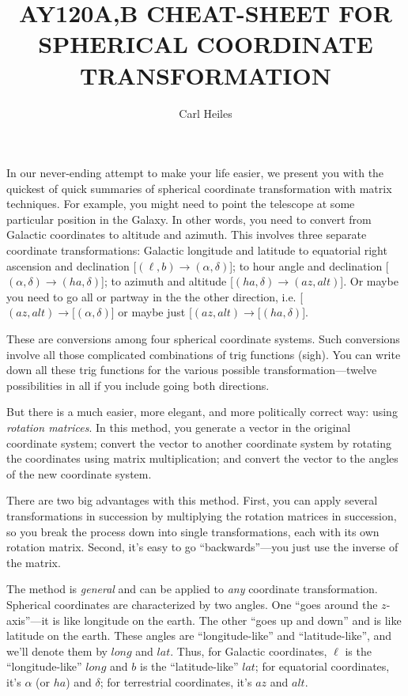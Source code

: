 

\title{AY120A,B CHEAT-SHEET FOR SPHERICAL COORDINATE TRANSFORMATION}
\author{Carl Heiles}

	In our never-ending attempt to make your life easier, we present
you with the quickest of quick summaries of spherical coordinate
transformation with matrix techniques.  For example, you might need to
point the telescope at some particular position in the Galaxy.  In other
words, you need to convert from Galactic coordinates to altitude and
azimuth.  This involves three separate coordinate transformations:
Galactic longitude and latitude to equatorial right ascension and
declination [$(\ell, b) \rightarrow (\alpha, \delta)$]; to hour angle
and declination [$(\alpha, \delta) \rightarrow (ha, \delta)$]; to
azimuth and altitude [$(ha, \delta) \rightarrow (az, alt)$].  Or maybe
you need to go all or partway in the the other direction, i.e.  [$(az,
alt) \rightarrow [(\alpha, \delta)$] or maybe just [$(az, alt)
\rightarrow [(ha, \delta)$]. 

	These are conversions among four spherical coordinate systems. 
Such conversions involve all those complicated combinations of trig
functions (sigh).  You can write down all these trig functions for the
various possible transformation---twelve possibilities in all if you
include going both directions. 

	But there is a much easier, more elegant, and more politically
correct way: using {\it rotation matrices}.   In this method, you
generate a vector in the original coordinate system; convert the vector
to another coordinate system by rotating the coordinates using matrix
multiplication; and convert the vector to the angles of the new
coordinate system.  

	There are two big advantages with this method.  First, you can
apply several transformations in succession by multiplying the rotation
matrices in succession, so you break the process down into single
transformations, each with its own rotation matrix.  Second, it's easy
to go ``backwards''---you just use the inverse of the matrix. 

	The method is {\it general} and can be applied to {\it any}
coordinate transformation.  Spherical coordinates are characterized by
two angles.  One ``goes around the $z$-axis''---it is like longitude on
the earth.  The other ``goes up and down'' and is like latitude on the
earth.  These angles are ``longitude-like'' and ``latitude-like'', and
we'll denote them by $long$ and $lat$.  Thus, for Galactic coordinates,
$\ell$ is the ``longitude-like'' $long$ and $b$ is the ``latitude-like''
$lat$; for equatorial coordinates, it's $\alpha$ (or $ha$) and $\delta$;
for terrestrial coordinates, it's $az$ and $alt$. 

